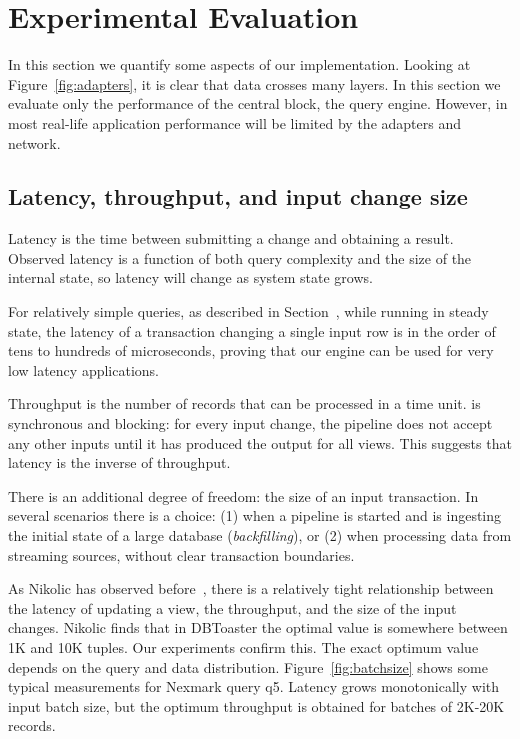 \section{Experimental Evaluation}\label{sec:experiments}

\newcommand{\query}[1]{\textsf{#1}}

In this section we quantify some aspects of our implementation.
Looking at Figure~\ref{fig:adapters}, it is clear that data crosses
many layers.  In this section we evaluate only the performance of
the central block, the \dbsp query engine.  However, in most real-life
application performance will be limited by the adapters and network.

\subsection{Latency, throughput, and input change size}

Latency is the time between submitting a change and obtaining a
result.  Observed latency is a function of both query complexity and
the size of the internal state, so latency will change as system
state grows.

For relatively simple queries, as described in
Section~, while running in steady state,
the latency of a transaction changing a single input row is in the
order of tens to hundreds of microseconds, proving that our engine can
be used for very low latency applications.

Throughput is the number of records that can be processed in a time
unit.  \dbsp is synchronous and blocking: for every input
change, the pipeline does not accept any other inputs until it has
produced the output for all views.  This suggests that latency is the
inverse of throughput.

There is an additional degree of freedom: the size of an input
transaction.  In several scenarios there is a choice: (1) when a
pipeline is started and is ingesting the initial state of a large
database (\emph{backfilling}), or (2) when processing data from
streaming sources, without clear transaction boundaries.

As Nikolic has observed before~\cite{nikolic-sigmod16}, there is a
relatively tight relationship between the latency of updating a view,
the throughput, and the size of the input changes.  Nikolic finds that
in DBToaster the optimal value is somewhere between 1K and 10K tuples.
Our experiments confirm this.  The exact optimum value depends on the
query and data distribution.  Figure~\ref{fig:batchsize} shows some
typical measurements for Nexmark query \query{q5}.  Latency grows
monotonically with input batch size, but the optimum throughput is
obtained for batches of 2K-20K records.

